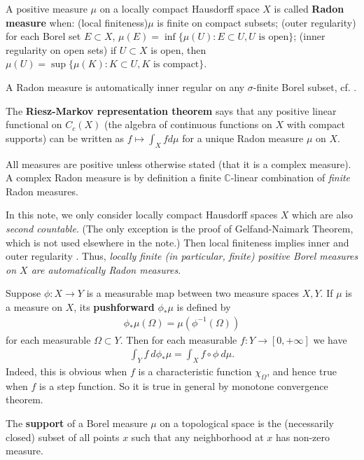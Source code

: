 \documentclass[12pt,a4paper,notitlepage]{article}
\theoremstyle{definition}
\theoremstyle{plain}
\newcommand{\Cbb}{\mathbb C}
\numberwithin{equation}{section}
\begin{document}
A positive measure $\mu$ on a locally compact Hausdorff space $X$ is called \textbf{Radon measure} when: (local finiteness)$\mu$ is finite on compact subsets; (outer regularity) for each Borel set $E\subset X$, $\mu(E)=\inf\{\mu(U):E\subset U,U\text{ is open}\}$; (inner regularity on open sets) if $U\subset X$ is open,   then $\mu(U)=\sup\{\mu(K):K\subset U,K\text{ is compact}\}$.  

A Radon measure is automatically inner regular on any $\sigma$-finite Borel subset, cf.  \cite[Prop. 7.5]{Fol}.

The \textbf{Riesz-Markov representation theorem} \cite[Thm.2.14]{Rud-R} says that any positive linear functional on $C_c(X)$ (the algebra of continuous functions on $X$ with compact supports) can be written as $f\mapsto\int_Xfd\mu$ for a unique Radon measure $\mu$ on $X$.

All measures are positive unless otherwise stated (that it is a complex measure). A complex Radon measure is by definition a finite $\Cbb$-linear combination of \textit{finite} Radon measures. 

In this note, we only consider  locally compact Hausdorff spaces $X$ which are also \textit{second countable}. (The only exception is the proof of Gelfand-Naimark Theorem, which is not used elsewhere in the note.) Then local finiteness implies inner and outer regularity \cite[Thm. 2.18]{Rud-R}. Thus, \textit{locally finite (in particular, finite) positive Borel measures on $X$ are automatically Radon measures}.

Suppose $\phi:X\rightarrow Y$ is a measurable map between two measure spaces $X,Y$. If $\mu$ is a measure on $X$, its \textbf{pushforward} $\phi_*\mu$ is defined by
\begin{align*}
\phi_*\mu(\Omega)=\mu(\phi^{-1}(\Omega))	
\end{align*}
for each measurable $\Omega\subset Y$. Then for each  measurable $f:Y\rightarrow[0,+\infty]$ we have
\begin{align}
\int_Y f~d\phi_*\mu=\int_X f\circ\phi ~d\mu.	\label{eq16}
\end{align}
Indeed, this is obvious when $f$ is a characteristic function $\chi_\Omega$, and hence true when $f$ is a step function. So it is true in general by monotone convergence theorem.

The \textbf{support} of a Borel  measure $\mu$ on a topological space is the (necessarily closed) subset of all points $x$ such that any neighborhood at $x$ has non-zero measure.
\end{document}
